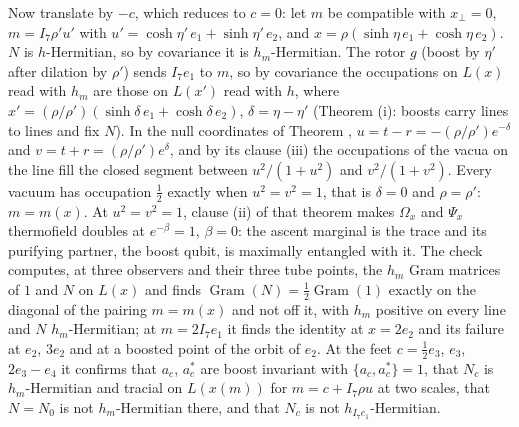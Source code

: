 Now translate by $-c$, which reduces to $c = 0$: let $m$ be compatible with $x_{\perp} = 0$, $m = I_{7}\rho' u'$ with $u' = \cosh\eta'\,e_{1} + \sinh\eta'\,e_{2}$, and $x = \rho(\sinh\eta\,e_{1} + \cosh\eta\,e_{2})$. $N$ is $h$-Hermitian, so by covariance it is $h_{m}$-Hermitian. The rotor $g$ (boost by $\eta'$ after dilation by $\rho'$) sends $I_{7}e_{1}$ to $m$, so by covariance the occupations on $L(x)$ read with $h_{m}$ are those on $L(x')$ read with $h$, where $x' = (\rho/\rho')(\sinh\delta\,e_{1} + \cosh\delta\,e_{2})$, $\delta = \eta - \eta'$ (Theorem (i): boosts carry lines to lines and fix $N$). In the null coordinates of Theorem , $u = t - r = -(\rho/\rho')e^{-\delta}$ and $v = t + r = (\rho/\rho')e^{\delta}$, and by its clause (iii) the occupations of the vacua on the line fill the closed segment between $u^{2}/(1 + u^{2})$ and $v^{2}/(1 + v^{2})$. Every vacuum has occupation $\tfrac12$ exactly when $u^{2} = v^{2} = 1$, that is $\delta = 0$ and $\rho = \rho'$: $m = m(x)$. At $u^{2} = v^{2} = 1$, clause (ii) of that theorem makes $\Omega_{x}$ and $\Psi_{x}$ thermofield doubles at $e^{-\beta} = 1$, $\beta = 0$: the ascent marginal is the trace and its purifying partner, the boost qubit, is maximally entangled with it. The check computes, at three observers and their three tube points, the $h_{m}$ Gram matrices of $1$ and $N$ on $L(x)$ and finds $\operatorname{Gram}(N) = \tfrac12\operatorname{Gram}(1)$ exactly on the diagonal of the pairing $m = m(x)$ and not off it, with $h_{m}$ positive on every line and $N$ $h_{m}$-Hermitian; at $m = 2I_{7}e_{1}$ it finds the identity at $x = 2e_{2}$ and its failure at $e_{2}$, $3e_{2}$ and at a boosted point of the orbit of $e_{2}$. At the feet $c = \tfrac12 e_{3}$, $e_{3}$, $2e_{3} - e_{4}$ it confirms that $a_{c}$, $a_{c}^{*}$ are boost invariant with $\{a_{c}, a_{c}^{*}\} = 1$, that $N_{c}$ is $h_{m}$-Hermitian and tracial on $L(x(m))$ for $m = c + I_{7}\rho u$ at two scales, that $N = N_{0}$ is not $h_{m}$-Hermitian there, and that $N_{c}$ is not $h_{I_{7}e_{1}}$-Hermitian.

